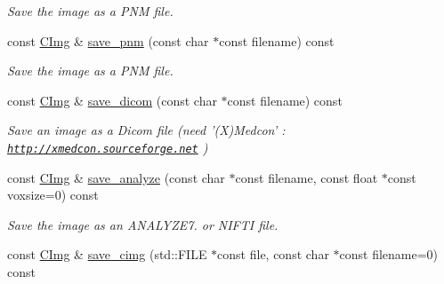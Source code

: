 \begin{DoxyCompactItemize}
\begin{DoxyCompactList}\small\item\em Save the image as a P\-N\-M file. \end{DoxyCompactList}\item 
\hypertarget{structcimg__library_1_1_c_img_aedf6a9b0a3333feee2bf369b9d484935}{const \hyperlink{structcimg__library_1_1_c_img}{C\-Img} \& \hyperlink{structcimg__library_1_1_c_img_aedf6a9b0a3333feee2bf369b9d484935}{save\-\_\-pnm} (const char $\ast$const filename) const }\label{structcimg__library_1_1_c_img_aedf6a9b0a3333feee2bf369b9d484935}

\begin{DoxyCompactList}\small\item\em Save the image as a P\-N\-M file. \end{DoxyCompactList}\item 
\hypertarget{structcimg__library_1_1_c_img_ad442714fe10a5135688f023b2a00cb29}{const \hyperlink{structcimg__library_1_1_c_img}{C\-Img} \& \hyperlink{structcimg__library_1_1_c_img_ad442714fe10a5135688f023b2a00cb29}{save\-\_\-dicom} (const char $\ast$const filename) const }\label{structcimg__library_1_1_c_img_ad442714fe10a5135688f023b2a00cb29}

\begin{DoxyCompactList}\small\item\em Save an image as a Dicom file (need '(X)Medcon' \-: \href{http://xmedcon.sourceforge.net}{\tt http\-://xmedcon.\-sourceforge.\-net} ) \end{DoxyCompactList}\item 
\hypertarget{structcimg__library_1_1_c_img_a29f58c110f5e216e4fa457bbb343aab2}{const \hyperlink{structcimg__library_1_1_c_img}{C\-Img} \& \hyperlink{structcimg__library_1_1_c_img_a29f58c110f5e216e4fa457bbb343aab2}{save\-\_\-analyze} (const char $\ast$const filename, const float $\ast$const voxsize=0) const }\label{structcimg__library_1_1_c_img_a29f58c110f5e216e4fa457bbb343aab2}

\begin{DoxyCompactList}\small\item\em Save the image as an A\-N\-A\-L\-Y\-Z\-E7. or N\-I\-F\-T\-I file. \end{DoxyCompactList}\item 
\hypertarget{structcimg__library_1_1_c_img_a34e0be5beb5d91caa5ae59ee2e039aa4}{const \hyperlink{structcimg__library_1_1_c_img}{C\-Img} \& \hyperlink{structcimg__library_1_1_c_img_a34e0be5beb5d91caa5ae59ee2e039aa4}{save\-\_\-cimg} (std\-::\-F\-I\-L\-E $\ast$const file, const char $\ast$const filename=0) const }\label{structcimg__library_1_1_c_img_a34e0be5beb5d91caa5ae59ee2e039aa4}


\end{DoxyCompactItemize}
